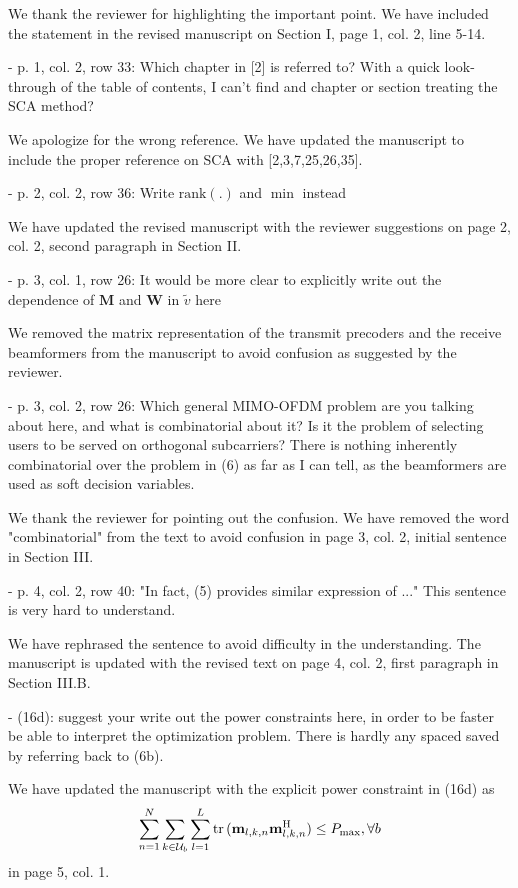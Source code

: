\begin{itemize}
\begin{itemize}
\resp We thank the reviewer for highlighting the important point. We have included the statement in the revised manuscript on Section I, page 1, col. 2, line 5-14.

 - p. 1, col. 2, row 33: Which chapter in [2] is referred to? With a quick look-through of the table of contents, I can't find and chapter or section treating the SCA method?

\resp We apologize for the wrong reference. We have updated the manuscript to include the proper reference on SCA with [2,3,7,25,26,35].

 - p. 2, col. 2, row 36: Write $\text{rank}(.)$ and $\min$ instead

\resp We have updated the revised manuscript with the reviewer suggestions on page 2, col. 2, second paragraph in Section II.

 - p. 3, col. 1, row 26: It would be more clear to explicitly write out the dependence of $\mathbf{M}$ and $\mathbf{W}$ in $\tilde{v}$ here

\resp We removed the matrix representation of the transmit precoders and the receive beamformers from the manuscript to avoid confusion as suggested by the reviewer.

 - p. 3, col. 2, row 26: Which general MIMO-OFDM problem are you talking about here, and what is combinatorial about it? Is it the problem of selecting users to be served on orthogonal subcarriers? There is nothing inherently combinatorial over the problem in (6) as far as I can tell, as the beamformers are used as soft decision variables.

\resp We thank the reviewer for pointing out the confusion. We have removed the word "combinatorial" from the text to avoid confusion in page 3, col. 2, initial sentence in Section III.

 - p. 4, col. 2, row 40: "In fact, (5) provides similar expression of ..." This sentence is very hard to understand.

\resp We have rephrased the sentence to avoid difficulty in the understanding. The manuscript is updated with the revised text on page 4, col. 2, first paragraph in Section III.B.

 - (16d): suggest your write out the power constraints here, in order to be faster be able to interpret the optimization problem. There is hardly any spaced saved by referring back to (6b).

\resp We have updated the manuscript with the explicit power constraint in (16d) as
\[\sum_{n = 1}^N \sum_{k \in \mathcal{U}_b} \sum_{l=1}^L \mathrm{tr} \, (\mathbf{m}_{l,k,n} \mathbf{m}_{l,k,n}^{\mathrm{H}}) \leq P_{{\max}}, \forall b\]
in page 5, col. 1.


\end{itemize}
\end{itemize}
